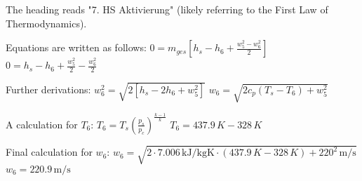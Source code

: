 The heading reads "7. HS Aktivierung" (likely referring to the First Law of Thermodynamics).  

Equations are written as follows:  
\( 0 = m_{ges} \left[ h_s - h_6 + \frac{w_5^2 - w_6^2}{2} \right] \)  
\( 0 = h_s - h_6 + \frac{w_5^2}{2} - \frac{w_6^2}{2} \)  

Further derivations:  
\( w_6^2 = \sqrt{2 \left[ h_s - 2 h_6 + w_5^2 \right]} \)  
\( w_6 = \sqrt{2 c_p (T_s - T_6) + w_5^2} \)  

A calculation for \( T_6 \):  
\( T_6 = T_s \left( \frac{p_s}{p_c} \right)^{\frac{k-1}{k}} \)  
\( T_6 = 437.9 \, K - 328 \, K \)  

Final calculation for \( w_6 \):  
\( w_6 = \sqrt{2 \cdot 7.006 \, \text{kJ/kgK} \cdot (437.9 \, K - 328 \, K) + 220^2 \, \text{m/s}} \)  
\( w_6 = 220.9 \, \text{m/s} \)